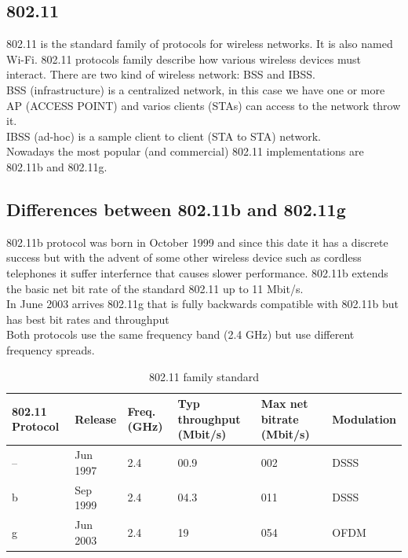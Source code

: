 	\subsection{802.11} \label{theory:prot_specs}
	802.11 is the standard family of protocols for wireless networks. It is also named Wi-Fi. 802.11 protocols family describe how various wireless devices must interact. There are two kind of wireless network: BSS and IBSS.\\
	BSS (infrastructure) is a centralized network, in this case we have one or more AP (ACCESS POINT) and varios clients (STAs) can access to the network throw it.\\
	IBSS (ad-hoc) is a sample client to client (STA to STA) network.\\
	Nowadays the most popular (and commercial) 802.11 implementations are 802.11b and 802.11g.
	
	\subsection{Differences between 802.11b and 802.11g} \label{theory:prot_differences}
	
	802.11b protocol was born in October 1999 and since this date it has a discrete success but with the advent of some other wireless device such as cordless telephones it suffer interfernce that causes slower performance. 802.11b extends the basic net bit rate of the standard 802.11 up to 11 Mbit/s.\\
	
	In June 2003 arrives 802.11g that is fully backwards compatible with 802.11b but has best bit rates and throughput\\
	
	Both protocols use the same frequency band (2.4 GHz) but use different frequency spreads.
	
	\begin{table}[h]
		
		\begin{tabularx}{15cm}{ | X X X X X X | }
			\hline
				802.11 Protocol & Release & Freq. (GHz) & Typ throughput (Mbit/s) & Max net bitrate (Mbit/s) & Modulation \\
			\hline
				-- & Jun 1997 & 2.4 & 00.9 & 002 & DSSS \\
				b & Sep 1999 & 2.4 & 04.3 & 011 & DSSS \\
				g & Jun 2003 & 2.4 & 19 & 054 & OFDM \\
			\hline
		\end{tabularx}
		
		\caption{802.11 family standard}
		\label{802.11_family_standard}
	\end{table}
	
